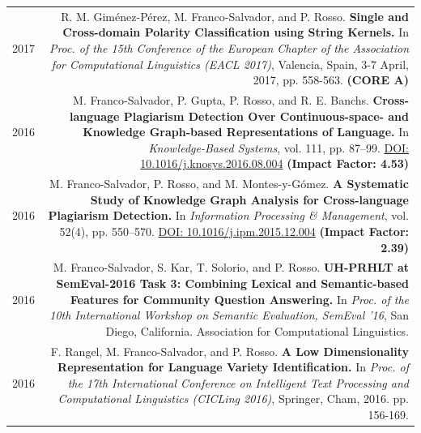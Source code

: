 \documentclass[10pt]{article}
\begin{document}
\begin{tabular}{L!{\VRule}R}
	2017&R. M. Gim{\'e}nez-P{\'e}rez, M. Franco-Salvador, and P. Rosso. \textbf{Single and Cross-domain Polarity Classification using String Kernels.}
	In \emph{Proc. of the 15th Conference of the European Chapter of the Association for Computational Linguistics (EACL 2017)}, Valencia, Spain, 3-7 April, 2017, pp. 558-563. \textbf{(CORE A)}\vspace{5pt}\\	
	2016&M. Franco-Salvador, P. Gupta, P. Rosso, and R. E. Banchs. \textbf{Cross-language Plagiarism Detection Over Continuous-space- and Knowledge Graph-based Representations of Language.}
	In \emph{Knowledge-Based Systems}, vol. 111, pp. 87--99. \href{http://dx.doi.org/10.1016/j.knosys.2016.08.004}{DOI: 10.1016/j.knosys.2016.08.004} \textbf{(Impact Factor: 4.53)} \vspace{5pt}\\
	2016&M. Franco-Salvador, P. Rosso, and M. Montes-y-G{\'o}mez. \textbf{A Systematic Study of Knowledge Graph Analysis for Cross-language Plagiarism Detection.}
	In \emph{Information Processing \& Management}, vol. 52(4), pp. 550--570. \href{http://dx.doi.org/10.1016/j.ipm.2015.12.004}{DOI: 10.1016/j.ipm.2015.12.004} \textbf{(Impact Factor: 2.39)} \vspace{5pt}\\
	2016 &M. Franco-Salvador, S. Kar, T. Solorio, and P. Rosso. \textbf{UH-PRHLT at SemEval-2016 Task 3: Combining Lexical and Semantic-based Features for Community Question Answering.} In \emph{Proc. of the 10th International Workshop on Semantic Evaluation, SemEval '16}, San Diego, California. Association for Computational Linguistics. \vspace{5pt}\\
	2016 &F. Rangel, M. Franco-Salvador, and P. Rosso. \textbf{A Low Dimensionality Representation for Language Variety Identification.} In \emph{Proc.  of  the  17th  International Conference on Intelligent Text Processing and Computational Linguistics (CICLing 2016)}, Springer, Cham, 2016. pp. 156-169. \vspace{5pt}\\
\end{tabular}
\end{document}
